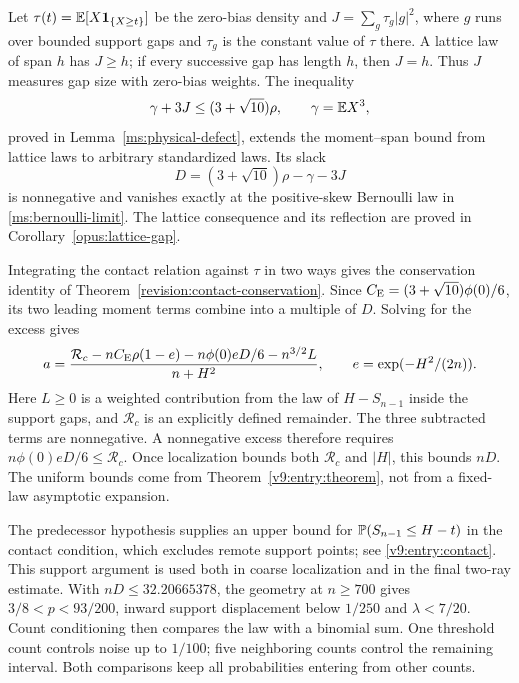 Let $\tau(t)=\mathbb E[X\mathbf 1_{\{X\ge t\}}]$ be the zero-bias density and
$J=\sum_g\tau_g|g|^2$, where $g$ runs over bounded support gaps and
$\tau_g$ is the constant value of $\tau$ there. A lattice law of span
$h$ has $J\ge h$; if every successive gap has length $h$, then $J=h$.
Thus $J$ measures gap size with zero-bias weights. The inequality
\[
 \gamma+3J\le(3+\sqrt{10})\rho,\qquad \gamma=\mathbb E X^3,
\]
proved in Lemma~\ref{ms:physical-defect}, extends the moment--span
bound from lattice laws to arbitrary standardized laws. Its slack
\[
 D=(3+\sqrt{10})\rho-\gamma-3J
\]
is nonnegative and vanishes exactly at the positive-skew Bernoulli
law in \eqref{ms:bernoulli-limit}. The lattice consequence and its
reflection are proved in Corollary~\ref{opus:lattice-gap}.

Integrating the contact relation against $\tau$ in two ways gives the
conservation identity of Theorem~\ref{revision:contact-conservation}.
Since $C_{\mathrm E}=(3+\sqrt{10})\phi(0)/6$, its two leading moment terms
combine into a multiple of $D$. Solving for the excess gives
\[
 a=\frac{\mathcal R_c-nC_{\mathrm E}\rho(1-e)
             -n\phi(0)eD/6-n^{3/2}L}{n+H^2},
 \qquad e=\exp(-H^2/(2n)).
\]
Here $L\ge0$ is a weighted contribution from the law of $H-S_{n-1}$
inside the support gaps, and $\mathcal R_c$ is an explicitly defined
remainder. The three subtracted terms are nonnegative. A nonnegative
excess therefore requires $n\phi(0)eD/6\le\mathcal R_c$.
Once localization bounds both $\mathcal R_c$ and $|H|$, this bounds
$nD$. The uniform bounds come from Theorem~\ref{v9:entry:theorem},
not from a fixed-law asymptotic expansion.

The predecessor hypothesis supplies an upper bound for
$\mathbb P(S_{n-1}\le H-t)$ in the contact condition, which excludes remote
support points; see \eqref{v9:entry:contact}. This support argument is
used both in coarse localization and in the final two-ray estimate.
With $nD\le32.20665378$, the geometry at $n\ge700$ gives
$3/8<p<93/200$, inward support displacement below $1/250$ and
$\lambda<7/20$. Count conditioning then compares the law with a
binomial sum. One threshold count controls noise up to $1/100$;
five neighboring counts control the remaining interval. Both
comparisons keep all probabilities entering from other counts.

